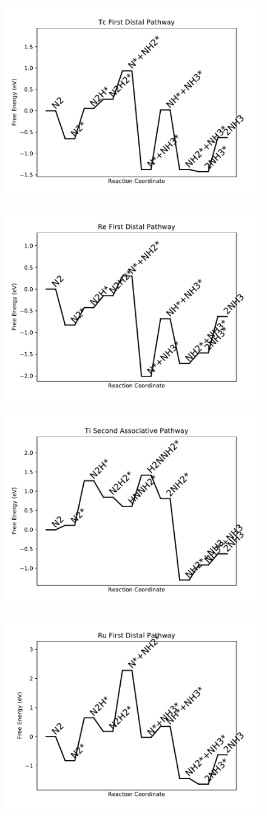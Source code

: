 \documentclass[journal=jacsat,manuscript=article]{achemso}
\begin{document}
\begin{figure}
\includegraphics[width=0.5\linewidth]{data/plots/Tc_distal_1.pdf}
\label{fig:Tc_distal_1}
\end{figure}

\newpage
\begin{figure}
\includegraphics[width=0.5\linewidth]{data/plots/Re_distal_1.pdf}
\label{fig:Re_distal_1}
\end{figure}

\begin{figure}
\includegraphics[width=0.5\linewidth]{data/plots/Ti_associative_2.pdf}
\label{fig:Ti_associative_2}
\end{figure}

\newpage
\begin{figure}
\includegraphics[width=0.5\linewidth]{data/plots/Ru_distal_1.pdf}
\label{fig:Ru_distal_1}
\end{figure}
\end{document}
